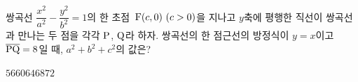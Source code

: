 쌍곡선 $\dfrac{x^2}{a^2}-\dfrac{y^2}{b^2}=1$의 한 초점~$\pt{F}(c{,}\mkern3mu\mathopen{}0)\ (c>0)$을 지나고 \mbox{$y$축에} 평행한 직선이 쌍곡선과 만나는 두 점을 각각 $\mathrm{P}$, $\mathrm{Q}$라 하자. 쌍곡선의 한 점근선의 방정식이 $y=x$이고 $\overline{\mathrm{PQ}}=8$일 때, $a^2+b^2+c^2$의 값은? 
\begin{choices32}{$56$}{$60$}{$64$}{$68$}{$72$}\end{choices32}
